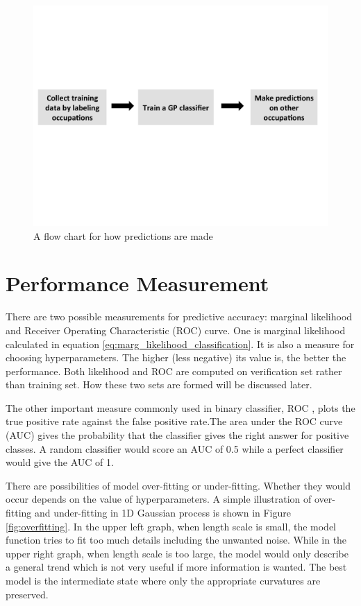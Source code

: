 \documentclass[11pt]{report}
\numberwithin{equation}{chapter}
\begin{document}
\begin{spacing}{2}
\begin{figure}[htb]
\centering
\includegraphics[scale=0.6]{prediction_flow.pdf}
\caption{A flow chart for how predictions are made}
\label{fig:flow}
\end{figure}
 

\section{Performance Measurement} 
There are two possible measurements for predictive accuracy: marginal likelihood and Receiver Operating Characteristic (ROC) curve. One is marginal likelihood calculated in equation \ref{eq:marg_likelihood_classification}. It is also a measure for choosing hyperparameters. The higher (less negative) its value is, the better the performance. Both likelihood and ROC are computed on verification set rather than training set. How these two sets are formed will be discussed later. 

The other important measure commonly used in binary classifier, ROC \cite{hanley1982meaning}\cite{bradley1997use}, plots the true positive rate against the false positive rate.The area under the ROC curve (AUC) gives the probability that the classifier gives the right answer for positive classes. A random classifier would score an AUC of 0.5 while a perfect classifier would give the AUC of 1. 

There are possibilities of model over-fitting or under-fitting. Whether they would occur depends on the value of hyperparameters. A simple illustration of over-fitting and under-fitting in 1D Gaussian process is shown in Figure \ref{fig:overfitting}. In the upper left graph, when length scale is small, the model function tries to fit too much details including the unwanted noise. While in the upper right graph, when length scale is too large, the model would only describe a general trend which is not very useful if more information is wanted. The best model is the intermediate state where only the appropriate curvatures are preserved. 


\end{spacing}
\end{document}

